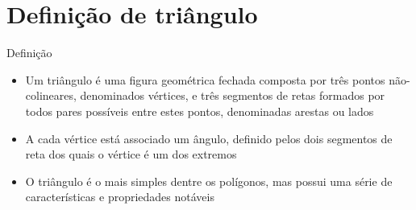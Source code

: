 \section{Definição de triângulo}

\begin{frame}[fragile]{Definição}

    \begin{itemize}
        \item Um triângulo é uma figura geométrica fechada composta por três pontos não-colineares, 
            denominados vértices, e três segmentos de retas formados por todos pares possíveis entre 
            estes pontos, denominadas arestas ou lados
        \pause

        \item A cada vértice está associado um ângulo, definido pelos dois segmentos de reta
            dos quais o vértice é um dos extremos
        \pause

        \item O triângulo é o mais simples dentre os polígonos, mas possui uma série de
            características e propriedades notáveis
        \pause

    \end{itemize}

    \begin{figure}
        \centering


    \end{figure}
\end{frame}

